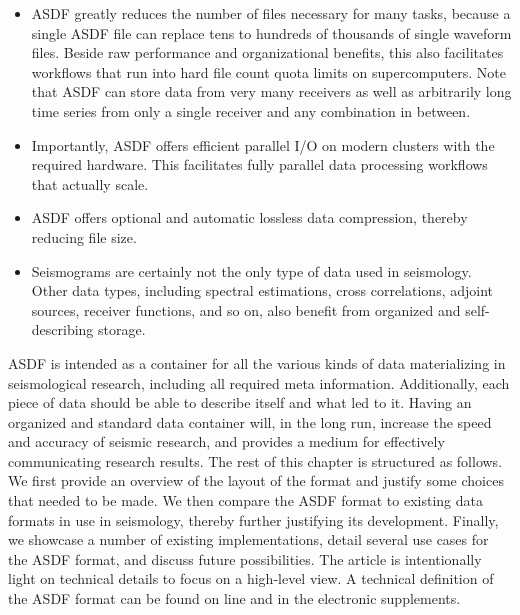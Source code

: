 \begin{itemize}
    \item ASDF greatly reduces the number of files necessary for many
        tasks, because a single ASDF file can replace tens to hundreds
        of thousands of single waveform files. Beside raw performance and
        organizational benefits, this also facilitates workflows that run into
        hard file count quota limits on supercomputers. Note that
        ASDF can store data from very many receivers as well as
        arbitrarily long time series from only a single receiver and any
        combination in between.

    \item Importantly, ASDF offers efficient parallel I/O on modern
        clusters with the required hardware. This facilitates fully parallel
        data processing workflows that actually scale.

    \item ASDF offers optional and automatic lossless data
        compression, thereby reducing file size.

    \item Seismograms are certainly not the only type of data used in
        seismology. Other data types, including spectral estimations,
        cross correlations, adjoint sources, receiver functions, and so on,
        also benefit from organized and self-describing storage.

\end{itemize}


ASDF is intended as a container for all the various kinds of data
materializing in seismological research, including all required meta
information. Additionally, each piece of data should be able to describe itself
and what led to it. Having an organized and standard data container will, in
the long run, increase the speed and accuracy of seismic research, and provides
a medium for effectively communicating research results.
The rest of this chapter is structured as follows. We first provide an
overview of the layout of the format and justify some choices that needed to be
made. We then compare the ASDF format to existing data formats in use
in seismology, thereby further justifying its development. Finally, we showcase
a number of existing implementations, detail several use cases for the
ASDF format, and discuss future possibilities. The article is
intentionally light on technical details to focus on a high-level view. A
technical definition of the ASDF format can be found on line and in the electronic
supplements.
